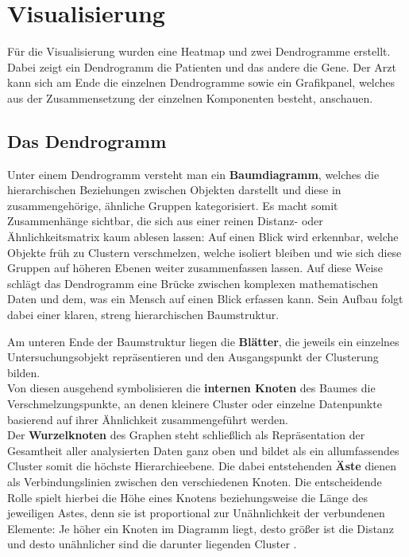 \documentclass[12pt]{article}
\begin{document}
\newpage
\pagestyle{fancy}
\fancyhead{}
\section{Visualisierung}
\label{visualisierung}

Für die Visualisierung wurden eine Heatmap und zwei Dendrogramme erstellt. Dabei zeigt ein Dendrogramm die Patienten und das andere die Gene. Der Arzt kann sich am Ende die einzelnen Dendrogramme sowie ein Grafikpanel, welches aus der Zusammensetzung der einzelnen Komponenten besteht, anschauen.

\subsection{Das Dendrogramm}

Unter einem Dendrogramm versteht man ein \textbf{Baumdiagramm}, welches die hierarchischen Beziehungen zwischen Objekten darstellt und diese in zusammengehörige, ähnliche Gruppen kategorisiert. Es macht somit Zusammenhänge sichtbar, die
sich aus einer reinen Distanz- oder Ähnlichkeitsmatrix kaum ablesen lassen: Auf einen Blick
wird erkennbar, welche Objekte früh zu Clustern verschmelzen, welche isoliert bleiben und wie
sich diese Gruppen auf höheren Ebenen weiter zusammenfassen lassen. Auf diese Weise schlägt das Dendrogramm eine Brücke zwischen komplexen mathematischen Daten und dem, was ein Mensch auf einen Blick erfassen kann. Sein Aufbau folgt dabei einer klaren, streng hierarchischen Baumstruktur.

Am unteren Ende der Baumstruktur liegen die \textbf{Blätter}, die jeweils ein 
einzelnes Untersuchungsobjekt repräsentieren und den Ausgangspunkt der Clusterung 
bilden. \\
 Von diesen ausgehend 
symbolisieren die \textbf{internen Knoten} des Baumes die Verschmelzungspunkte, 
an denen kleinere Cluster oder einzelne Datenpunkte basierend auf ihrer Ähnlichkeit 
zusammengeführt werden. \\
Der \textbf{Wurzelknoten} des Graphen steht schließlich 
als Repräsentation der Gesamtheit aller analysierten Daten ganz oben und bildet 
als ein allumfassendes Cluster somit die höchste Hierarchieebene. 
Die dabei entstehenden \textbf{Äste} dienen als Verbindungslinien zwischen den 
verschiedenen Knoten. Die entscheidende Rolle spielt hierbei die Höhe eines 
Knotens beziehungsweise die Länge des jeweiligen Astes, denn sie ist proportional 
zur Unähnlichkeit der verbundenen Elemente: Je höher ein Knoten im Diagramm liegt, 
desto größer ist die Distanz und desto unähnlicher sind die darunter liegenden 
Cluster \cite{ivchenko2026, LSE2026}.
\end{document}
